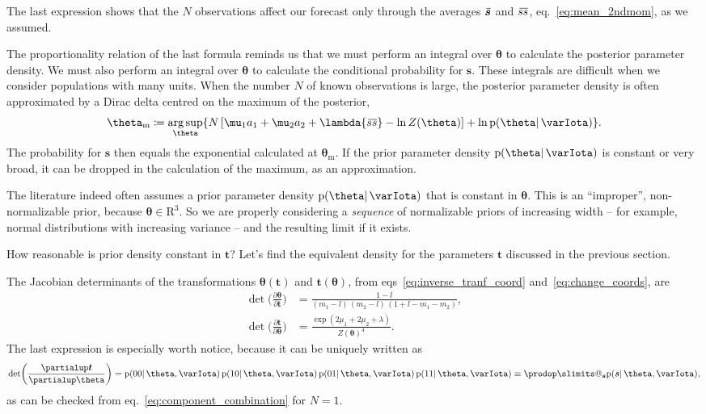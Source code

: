 \documentclass[\ifafour a4paper,12pt,\else a5paper,10pt,\fi%
onecolumn,oneside,article,%
british%
]{memoir}
\makeatletter
\theoremstyle{remark}
\theoremstyle{innote}
\def\prod{\DOTSI\prodop\slimits@}
\newcommand*{\de}{\partialup}%
\newcommand*{\RR}{\bm{\mathrm{R}}}
\newcommand*{\defd}{\coloneqq}
\newcommand*{\pf}{\mathrm{p}}%
\renewcommand*{\|}{\mathpunct{|}}
\newcommand*{\eqn}{eq.}%
\newcommand*{\eqns}{eqs}%
\newcommand*{\widebar}[1]{{\mkern1.5mu\skew{2}\overline{\mkern-1.5mu#1\mkern-1.5mu}\mkern 1.5mu}}
\DeclareMathOperator*{\argsup}{arg\,sup}
\newcommand*{\yI}{\varIota}
\newcommand*{\ys}{\bm{s}}
\newcommand*{\la}{\lambda}
\newcommand*{\yth}{\bm{\theta}}
\newcommand*{\ythm}{\yth_{\text{m}}}
\newcommand*{\yt}{\bm{t}}
\newcommand*{\yav}{\widebar{\bm{s}}}
\newcommand*{\ycv}{\widebar{ss}}
\makeatother
\begin{document}
The last expression shows that the $N$ observations affect our forecast
only through the averages $\yav$ and $\ycv$, \eqn~\eqref{eq:mean_2ndmom},
as we assumed.

The proportionality relation of the last formula reminds us that we must
perform an integral over $\yth$ to calculate the posterior parameter
density. We must also perform an integral over $\yth$ to calculate the
conditional probability for $\ys$. These integrals are difficult when we
consider populations with many units. When the number $N$ of known
observations is large, the posterior parameter density is often
approximated by a Dirac delta centred on the maximum of the posterior,
\begin{equation}
  \label{eq:max_posterior}
  \ythm \defd \argsup_{\yth}
  \{N\,[\mu_1 a_1 + \mu_2 a_2 + \la \ycv -\ln Z(\yth)]+
  \ln \pf(\yth \|\yI) \}.
\end{equation}
The probability for $\ys$ then equals the exponential calculated at
$\ythm$. If the prior parameter density $\pf(\yth \|\yI)$ is constant or
very broad, it can be dropped in the calculation of the maximum, as an
approximation.

The literature indeed often assumes a prior parameter density $\pf(\yth \|\yI)$
that is constant in $\yth$. This is an \enquote{improper}, non-normalizable
prior, because $\yth \in \RR^3$. So we are properly considering a
\emph{sequence} of normalizable priors of increasing width -- for example,
normal distributions with increasing variance -- and the resulting limit if
it exists.

How reasonable is prior density constant in $\yt$? Let's find the
equivalent density for the parameters $\yt$ discussed in the previous
section.

The Jacobian determinants of the transformations $\yth(\yt)$ and $\yt(\yth)$, from
\eqns~\eqref{eq:inverse_tranf_coord} and~\eqref{eq:change_coords}, are
\begin{align}
  \label{eq:jacobian_transf}
  \det\biggl( \frac{\de\yth}{\de\yt}\biggr)
  &= \frac{1-l}{(m_1-l)\,(m_2-l)\,(1+l-m_1-m_2)},
  \\
    \det\biggl( \frac{\de\yt}{\de\yth}\biggr)
  &= \frac{\exp(2\mu_1 + 2\mu_2 + \la)}{Z(\yth)^4}.
\end{align}
The last expression is especially worth notice, because it can be uniquely
written as
\begin{equation}
  \label{eq:jacobian_as_probs}
  \det\biggl( \frac{\de\yt}{\de\yth}\biggr) =
  \pf(00 \|\yth,\yI)\,
  \pf(10 \|\yth,\yI)\,
  \pf(01 \|\yth,\yI)\,
  \pf(11 \|\yth,\yI)
  \equiv \prod_{\ys}\pf(\ys \|\yth,\yI),
\end{equation}
as can be checked from \eqn~\eqref{eq:component_combination} for $N=1$.
\end{document}
